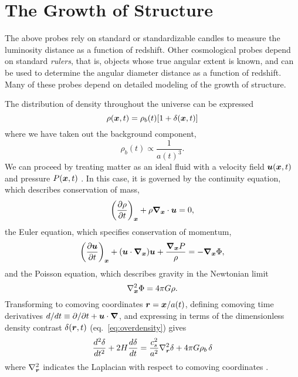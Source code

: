 \section{The Growth of Structure}
\label{sec:growth}
The above probes rely on standard or standardizable candles to measure the
luminosity distance as a function of redshift.  Other cosmological probes
depend on standard {\it rulers}, that is, objects whose true angular extent
is known, and can be used to determine the angular diameter distance as
a function of redshift.  Many of these probes depend on detailed modeling
of the growth of structure.

The distribution of density throughout the universe can be expressed
\begin{equation}
  \label{eq:overdensity}
  \rho(\boldsymbol{x}, t) = \rho_b(t)[1 + \delta(\boldsymbol{x}, t)]
\end{equation}
where we have taken out the background component,
\begin{equation}
  \rho_b(t) \propto \frac{1}{a(t)^3}.
\end{equation}
We can proceed by treating matter as an ideal fluid with a
velocity field $\boldsymbol{u}(\boldsymbol{x}, t)$ and pressure $P(\boldsymbol{x}, t)$
\citep{longair2008galaxy}.
In this case, it is governed by the
continuity equation, which describes conservation of mass,
\begin{equation}
  \label{eq:continuity}
  \left(\frac{\partial\rho}{\partial t}\right)_{\boldsymbol{x}}
  + \rho\boldsymbol{\nabla}_{\boldsymbol{x}}\cdot\boldsymbol{u} = 0,
\end{equation}
the Euler equation, which specifies conservation of momentum,
\begin{equation}
  \label{eq:euler}
  \left(\frac{\partial\boldsymbol{u}}{\partial t}\right)_{\boldsymbol{x}}
  + (\boldsymbol{u}\cdot\boldsymbol{\nabla}_{\boldsymbol{x}})\boldsymbol{u}
  + \frac{\boldsymbol{\nabla}_{\boldsymbol{x}}P}{\rho}
  = -\boldsymbol{\nabla}_{\boldsymbol{x}}\Phi,
\end{equation}
and the Poisson equation, which describes gravity in the Newtonian limit
\begin{equation}
  \label{eq:poisson}
  \nabla_{\boldsymbol{x}}^2\Phi = 4\pi G\rho.
\end{equation}
Transforming to comoving coordinates $\boldsymbol{r} = \boldsymbol{x}/a(t)$,
defining comoving time derivatives
$d/dt \equiv \partial/\partial t + \boldsymbol{u}\cdot\boldsymbol{\nabla}$,
and expressing in terms of the dimensionless density contrast
$\delta(\boldsymbol{r}, t)$ (eq.~\ref{eq:overdensity}) gives
\begin{equation}
  \label{eq:delta_evolution}
  \frac{d^2\delta}{d t^2} + 2 H \frac{d\delta}{d t}
  = \frac{c_s^2}{a^2}\nabla_{\boldsymbol{r}}^2\delta + 4\pi G \rho_b\,\delta
\end{equation}
where $\nabla^2_{\boldsymbol{r}}$ indicates the Laplacian with respect to comoving
coordinates \citep[for derivation see][\S11.2]{longair2008galaxy}.

